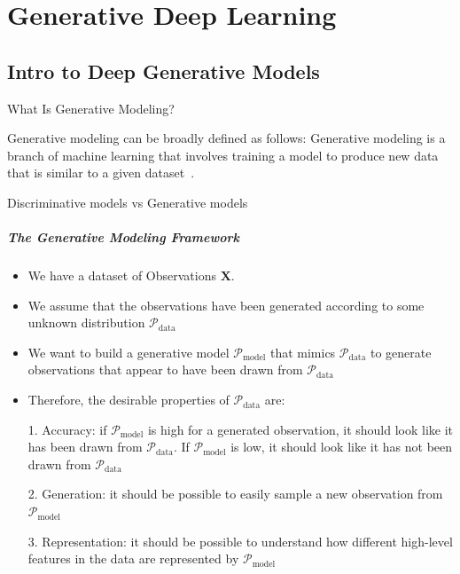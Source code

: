 \chapter{Generative Deep Learning}\label{chp:generative_deep_learning}

\section{Intro to Deep Generative Models}

What Is Generative Modeling?

Generative modeling can be broadly defined as follows:
Generative modeling is a branch of machine learning that involves training a model to produce new data that is similar to a given dataset~\cite{foster2022generative}.

Discriminative models vs Generative models

\paragraph{The Generative Modeling Framework}

\begin{itemize}
	\item We have a dataset of Observations $\mathbf{X}$. \item We assume that the observations have been generated according to some unknown distribution \(\mathcal{P}_{\textrm{data}}\)
	\item We want to build a generative model \(\mathcal{P}_{\textrm{model}}\) that mimics \(\mathcal{P}_{\textrm{data}}\) to generate observations that appear to have been drawn from \(\mathcal{P}_{\textrm{data}}\)
	\item Therefore, the desirable properties of \(\mathcal{P}_{\textrm{data}}\) are:

	      1. Accuracy: if \(\mathcal{P}_{\textrm{model}}\)  is high for a generated observation, it should look like it has been drawn from \(\mathcal{P}_{\textrm{data}}\). If \(\mathcal{P}_{\textrm{model}}\) is low, it should look like it has not been drawn from \(\mathcal{P}_{\textrm{data}}\)

	      2. Generation: it should be possible  to easily sample a new observation from \(\mathcal{P}_{\textrm{model}}\)

	      3. Representation:  it should be possible to understand how different high-level features in the data are represented by \(\mathcal{P}_{\textrm{model}}\)
\end{itemize}

